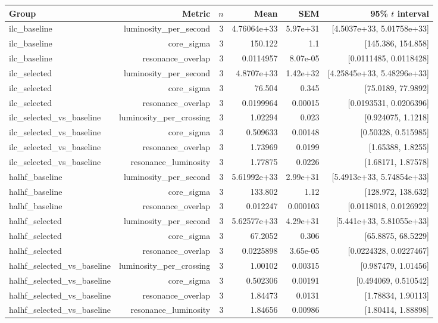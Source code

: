 \begin{tabular}{@{}lrrrrr@{}}
\toprule
Group & Metric & $n$ & Mean & SEM & 95\% $t$ interval\\
\midrule
ilc\_baseline & luminosity\_per\_second & 3 & 4.76064e+33 & 5.97e+31 & [4.5037e+33, 5.01758e+33]\\
ilc\_baseline & core\_sigma & 3 & 150.122 & 1.1 & [145.386, 154.858]\\
ilc\_baseline & resonance\_overlap & 3 & 0.0114957 & 8.07e-05 & [0.0111485, 0.0118428]\\
ilc\_selected & luminosity\_per\_second & 3 & 4.8707e+33 & 1.42e+32 & [4.25845e+33, 5.48296e+33]\\
ilc\_selected & core\_sigma & 3 & 76.504 & 0.345 & [75.0189, 77.9892]\\
ilc\_selected & resonance\_overlap & 3 & 0.0199964 & 0.00015 & [0.0193531, 0.0206396]\\
ilc\_selected\_vs\_baseline & luminosity\_per\_crossing & 3 & 1.02294 & 0.023 & [0.924075, 1.1218]\\
ilc\_selected\_vs\_baseline & core\_sigma & 3 & 0.509633 & 0.00148 & [0.50328, 0.515985]\\
ilc\_selected\_vs\_baseline & resonance\_overlap & 3 & 1.73969 & 0.0199 & [1.65388, 1.8255]\\
ilc\_selected\_vs\_baseline & resonance\_luminosity & 3 & 1.77875 & 0.0226 & [1.68171, 1.87578]\\
halhf\_baseline & luminosity\_per\_second & 3 & 5.61992e+33 & 2.99e+31 & [5.4913e+33, 5.74854e+33]\\
halhf\_baseline & core\_sigma & 3 & 133.802 & 1.12 & [128.972, 138.632]\\
halhf\_baseline & resonance\_overlap & 3 & 0.012247 & 0.000103 & [0.0118018, 0.0126922]\\
halhf\_selected & luminosity\_per\_second & 3 & 5.62577e+33 & 4.29e+31 & [5.441e+33, 5.81055e+33]\\
halhf\_selected & core\_sigma & 3 & 67.2052 & 0.306 & [65.8875, 68.5229]\\
halhf\_selected & resonance\_overlap & 3 & 0.0225898 & 3.65e-05 & [0.0224328, 0.0227467]\\
halhf\_selected\_vs\_baseline & luminosity\_per\_crossing & 3 & 1.00102 & 0.00315 & [0.987479, 1.01456]\\
halhf\_selected\_vs\_baseline & core\_sigma & 3 & 0.502306 & 0.00191 & [0.494069, 0.510542]\\
halhf\_selected\_vs\_baseline & resonance\_overlap & 3 & 1.84473 & 0.0131 & [1.78834, 1.90113]\\
halhf\_selected\_vs\_baseline & resonance\_luminosity & 3 & 1.84656 & 0.00986 & [1.80414, 1.88898]\\
\bottomrule
\end{tabular}
